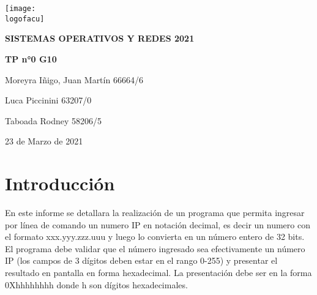 \documentclass[12pt,a4paper]{article} %
\newcommand{\materia}{SISTEMAS OPERATIVOS Y REDES 2021}
\newcommand{\Date}{23 de Marzo de 2021}
\newcommand{\logofacu}{logo-unlp.png}
\begin{document}
	\cfoot{\thepage}
	\begin{titlepage}
	\centering                 
	\texttt{[image: \\logofacu]}\par\vspace{1cm}
	{\scshape\LARGE \textbf{\materia}}\par\vspace{0.2cm}
	{\Huge\bfseries\textcolor{colorfacu}{TP n°0 G10}}\par\vspace{1cm}
	{\large Moreyra Iñigo, Juan Martín
66664/6}\par\vspace{0.2cm}
	{\large Luca Piccinini 63207/0}\par\vspace{0.2cm}
	{\large Taboada Rodney 58206/5}\par\vspace{0.2cm}
	{\large \Date\par}
	\end{titlepage}
	\clearpage
	\tableofcontents
	\clearpage
	\section{Introducción}
	En este informe se detallara la realización de un programa que permita ingresar por línea de comando un numero IP en notación decimal, es decir un numero con el formato xxx.yyy.zzz.uuu y luego lo convierta en un número entero de 32 bits. El programa debe validar que el número ingresado sea efectivamente un número IP (los campos de 3 dígitos deben estar en el rango 0-255) y presentar el resultado en pantalla en forma hexadecimal. La presentación debe ser en la forma 0Xhhhhhhhh donde h son dígitos hexadecimales.\par
\end{document}
